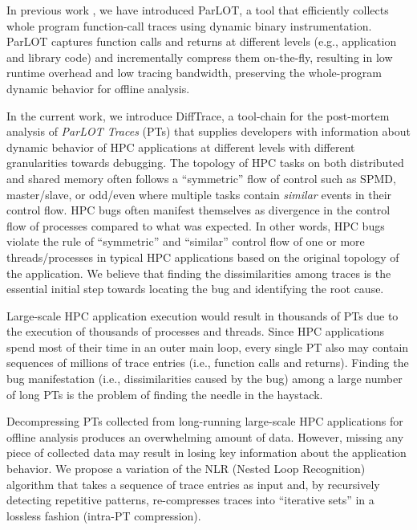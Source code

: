 In previous work \cite{parlot}, we have introduced ParLOT, a tool that efficiently collects whole program function-call traces using dynamic binary instrumentation.
%
ParLOT captures function calls and returns at different levels (e.g., application and library code) and incrementally compress them on-the-fly, resulting in low runtime overhead and low tracing bandwidth, preserving the whole-program dynamic behavior for offline analysis.
%

In the current work, we introduce DiffTrace, a tool-chain for the post-mortem analysis of \textit{ParLOT Traces} (PTs) that supplies developers with information about dynamic behavior of HPC applications at different levels with different granularities towards debugging. 
%
The topology of HPC tasks on both distributed and shared memory often follows a ``symmetric'' flow of control such as SPMD, master/slave, or odd/even where multiple tasks contain \textit{similar} events in their control flow.
%
HPC bugs often manifest themselves as divergence in the control flow of processes compared to what was expected.
%
In other words, HPC bugs violate the rule of ``symmetric'' and ``similar'' control flow of one or more threads/processes in typical HPC applications based on the original topology of the application.
%
We believe that finding the dissimilarities among traces is the essential initial step towards locating the bug and identifying the root cause.

Large-scale HPC application execution would result in thousands of PTs due to the execution of thousands of processes and threads.
%
Since HPC applications spend most of their time in an outer main loop, every single PT also may contain sequences of millions of trace entries (i.e., function calls and returns).
%
Finding the bug manifestation (i.e., dissimilarities caused by the bug) among a large number of long PTs is the problem of finding the needle in the haystack.

%
Decompressing PTs collected from long-running large-scale HPC applications for offline analysis produces an overwhelming amount of data. However, missing any piece of collected data may result in losing key information about the application behavior.
%
We propose a variation of the NLR (Nested Loop Recognition) algorithm \cite{Ketterlin-nlr} that takes a sequence of trace entries as input and, by recursively detecting repetitive patterns, re-compresses traces into ``iterative sets'' in a lossless fashion (intra-PT compression).  
%

